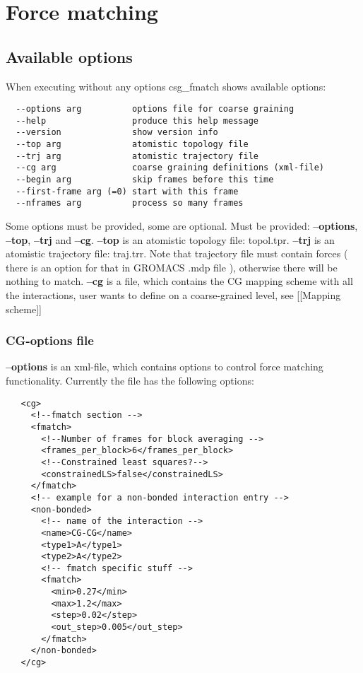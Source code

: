 \section{Force matching}
\subsection{Available options}
When executing without any options csg\_fmatch shows available options:
\begin{verbatim}
  --options arg          options file for coarse graining
  --help                 produce this help message
  --version              show version info
  --top arg              atomistic topology file
  --trj arg              atomistic trajectory file
  --cg arg               coarse graining definitions (xml-file)
  --begin arg            skip frames before this time
  --first-frame arg (=0) start with this frame
  --nframes arg          process so many frames
\end{verbatim}
Some options must be provided, some are optional. Must be provided: \textbf{--options}, \textbf{--top}, \textbf{--trj} and \textbf{--cg}. \textbf{--top} is an atomistic topology file: topol.tpr. \textbf{--trj} is an atomistic trajectory file: traj.trr. Note that trajectory file must contain forces ( there is an option for that in GROMACS .mdp file ), otherwise there will be nothing to match. \textbf{--cg} is a file, which contains the CG mapping scheme with all the interactions, user wants to define on a coarse-grained level, see [[Mapping scheme]]

\subsubsection{CG-options file}
\textbf{--options} is an xml-file, which contains options to control force matching functionality. 
Currently the file has the following options:
\begin{verbatim}
   <cg>
     <!--fmatch section -->
     <fmatch>
       <!--Number of frames for block averaging -->
       <frames_per_block>6</frames_per_block>
       <!--Constrained least squares?-->
       <constrainedLS>false</constrainedLS>
     </fmatch>
     <!-- example for a non-bonded interaction entry -->
     <non-bonded>
       <!-- name of the interaction -->
       <name>CG-CG</name>
       <type1>A</type1>
       <type2>A</type2>
       <!-- fmatch specific stuff -->
       <fmatch>
         <min>0.27</min>
         <max>1.2</max>
         <step>0.02</step>
         <out_step>0.005</out_step>
       </fmatch>
     </non-bonded>
   </cg>
\end{verbatim}

